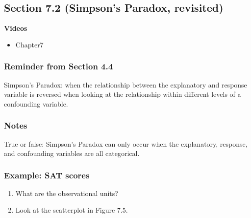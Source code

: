 \documentclass[
]{report}
\providecommand{\tightlist}{%
  \setlength{\itemsep}{0pt}\setlength{\parskip}{0pt}}
\newcommand{\rgs}{\vspace{12pt}} %
\begin{document}
\hypertarget{section-7.2-simpsons-paradox-revisited}{%
\subsection*{Section 7.2 (Simpson's Paradox, revisited)}\label{section-7.2-simpsons-paradox-revisited}}


\textbf{Videos}

\begin{itemize}
\tightlist
\item
  Chapter7
\end{itemize}


\hypertarget{reminder-from-section-4.4}{%
\subsubsection*{Reminder from Section 4.4}\label{reminder-from-section-4.4}}

Simpson's Paradox: when the relationship between the explanatory and response variable is reversed when looking at the relationship within different levels of a confounding variable.

\hypertarget{notes-12}{%
\subsubsection*{Notes}\label{notes-12}}

True or false: Simpson's Paradox can only occur when the explanatory, response, and confounding variables are all categorical.

\hypertarget{example-sat-scores}{%
\subsubsection*{Example: SAT scores}\label{example-sat-scores}}

\begin{enumerate}
\def\labelenumi{\arabic{enumi}.}
\item
  What are the observational units?\\
  \rgs
\item
  Look at the scatterplot in Figure 7.5.
\end{enumerate}
\end{document}
